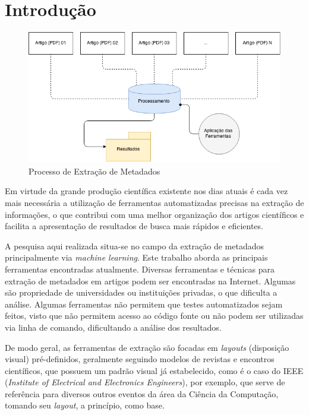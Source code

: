 
\chapter{Introdução}
\label{cha:introduction}


\begin{figure}
	\centering
	\caption{Processo de Extração de Metadados}
	\label{fig:introduction}
	\includegraphics[width=0.9\linewidth]{./assets/images/introduction}
\end{figure}



Em virtude da grande produção científica existente nos dias atuais é cada vez mais necessária a utilização de ferramentas automatizadas precisas na extração de informações, o que contribui com uma melhor organização dos artigos científicos e facilita a apresentação de resultados de busca mais rápidos e eficientes.

A pesquisa aqui realizada situa-se no campo da extração de metadados principalmente via \textit{machine learning}. Este trabalho aborda as principais ferramentas encontradas atualmente. Diversas ferramentas e técnicas para extração de metadados em artigos podem ser encontradas na Internet. Algumas são propriedade de universidades ou instituições privadas, o que dificulta a análise. Algumas ferramentas não permitem que testes automatizados sejam feitos, visto que não permitem acesso ao código fonte ou não podem ser utilizadas via linha de comando, dificultando a análise dos resultados.

De modo geral, as ferramentas de extração são focadas em \textit{layouts} (disposição visual) pré-definidos, geralmente seguindo modelos de revistas e encontros científicos, que possuem um padrão visual já estabelecido, como é o caso do IEEE (\textit{Institute of Electrical and Electronics Engineers}), por exemplo, que serve de referência para diversos outros eventos da área da Ciência da Computação, tomando seu \textit{layout}, a princípio, como base.

